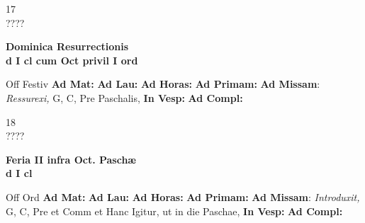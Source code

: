 \documentclass[10pt, openany]{book}
\begin{document}
    \begin{center}
        \begin{minipage}{3.5in}
            \vspace{2em}
            \begin{minipage}{0.5in}
                {\Huge 17} \\
                {\normalsize ????}
            \end{minipage}
            \begin{minipage}{3.0in}
                \textbf{ \large Dominica Resurrectionis \\
                \textnormal{\normalsize d I cl cum Oct privil I ord}}

            \end{minipage}
            \begin{justify}Off Festiv
                \textbf{Ad Mat: }
                \textbf{Ad Lau: }
                \textbf{Ad Horas: }
                \textbf{Ad Primam: }\textbf{Ad Missam}: \textit{Ressurexi,} G, C, Pre Paschalis, 
                \textbf{In Vesp: }
                \textbf{Ad Compl: }
            \end{justify}
        \end{minipage}
    \end{center}

    \begin{center}
        \begin{minipage}{3.5in}
            \vspace{2em}
            \begin{minipage}{0.5in}
                {\Huge 18} \\
                {\normalsize ????}
            \end{minipage}
            \begin{minipage}{3.0in}
                \textbf{ \large Feria II infra Oct. Paschæ \\
                \textnormal{\normalsize d I cl}}

            \end{minipage}
            \begin{justify}Off Ord
                \textbf{Ad Mat: }
                \textbf{Ad Lau: }
                \textbf{Ad Horas: }
                \textbf{Ad Primam: }\textbf{Ad Missam}: \textit{Introduxit,} G, C, Pre et Comm et Hanc Igitur, ut in die Paschae, 
                \textbf{In Vesp: }
                \textbf{Ad Compl: }
            \end{justify}
        \end{minipage}
    \end{center}
\end{document}
